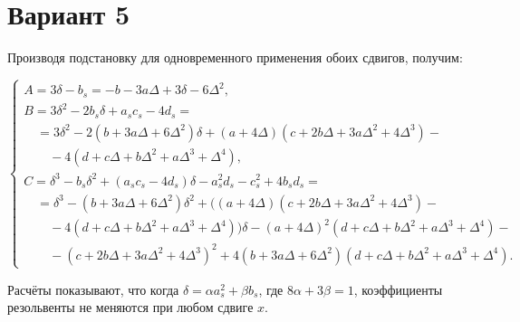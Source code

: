 \documentclass{article}
\begin{document}
\section*{Вариант 5}

Производя подстановку для одновременного применения обоих сдвигов, получим:

\begin{equation}
\begin{cases}
A = 3\delta - b_s = -b - 3a\Delta + 3\delta - 6\Delta^2, \\
B = 3\delta^2 - 2b_s\delta + a_s c_s - 4d_s = \\
\quad = 3\delta^2 - 2(b + 3a\Delta + 6\Delta^2)\delta + (a + 4\Delta)(c + 2b\Delta + 3a\Delta^2 + 4\Delta^3) - \\
\quad\quad - 4(d + c\Delta + b\Delta^2 + a\Delta^3 + \Delta^4), \\
C = \delta^3 - b_s\delta^2 + (a_s c_s - 4d_s)\delta - a_s^2 d_s - c_s^2 + 4b_s d_s = \\
\quad = \delta^3 - (b + 3a\Delta + 6\Delta^2)\delta^2 + \bigl((a + 4\Delta)(c + 2b\Delta + 3a\Delta^2 + 4\Delta^3) - \\
\quad\quad - 4(d + c\Delta + b\Delta^2 + a\Delta^3 + \Delta^4)\bigr)\delta - (a + 4\Delta)^2(d + c\Delta + b\Delta^2 + a\Delta^3 + \Delta^4)- \\
\quad\quad - (c + 2b\Delta + 3a\Delta^2 + 4\Delta^3)^2 + 4(b + 3a\Delta + 6\Delta^2)(d + c\Delta + b\Delta^2 + a\Delta^3 + \Delta^4).
\end{cases}
\end{equation}

Расчёты показывают, что когда $\delta = \alpha a_s^2 + \beta b_s$, где $8\alpha + 3\beta = 1$, коэффициенты резольвенты не меняются при любом сдвиге $x$.
\end{document}
